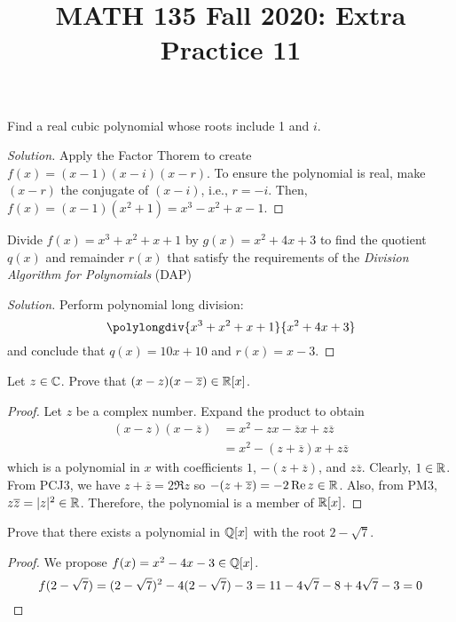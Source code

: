 
\usepackage{polynom}

\title{MATH 135 Fall 2020: Extra Practice 11}


\thispagestyle{firstpage}

\textbf{\@title}


\question Find a real cubic polynomial whose roots include 1 and $i$.
\begin{proof}[Solution]
  Apply the Factor Thorem to create $f(x) = (x-1)(x-i)(x-r)$.
  To ensure the polynomial is real, make $(x-r)$ the conjugate of $(x-i)$, i.e., $r=-i$.
  Then, $f(x) = (x-1)(x^2+1) = x^3 - x^2 + x - 1$.
\end{proof}


\question Divide $f(x)=x^3+x^2+x+1$ by $g(x)=x^2+4x+3$ to find the quotient $q(x)$ and remainder $r(x)$
that satisfy the requirements of the \emph{Division Algorithm for Polynomials} (DAP)
\begin{proof}[Solution]
  Perform polynomial long division:
  \[ \polylongdiv{x^3+x^2+x+1}{x^2+4x+3} \]
  and conclude that $q(x) = 10x + 10$ and $r(x) = x - 3$.
\end{proof}



\question Let $z\in\mathbb{C}$. Prove that $(x-z)(x-\overline{z}) \in \mathbb{R}[x]$.
\begin{proof}
  Let $z$ be a complex number.
  Expand the product to obtain
  \begin{align*}
    (x-z)(x-\overline{z}) & = x^2 - zx - \overline{z}x + z\overline{z}  \\
                          & = x^2 - (z + \overline{z})x + z\overline{z}
  \end{align*}
  which is a polynomial in $x$ with coefficients $1$, $-(z+\overline{z})$, and $z\overline{z}$.
  Clearly, $1 \in \mathbb{R}$.
  From PCJ3, we have $z+\overline{z} = 2\Re z$ so $-(z+\overline{z}) = -2 \Re z \in \mathbb{R}$.
  Also, from PM3, $z\overline{z}=|z|^2 \in \mathbb{R}$.
  Therefore, the polynomial is a member of $\mathbb{R}[x]$.
\end{proof}


\question Prove that there exists a polynomial in $\mathbb{Q}[x]$ with the root $2-\sqrt 7$.
\begin{proof}
  We propose $f(x) = x^2 - 4x - 3 \in \mathbb{Q}[x]$.
  \[ f(2-\sqrt{7}) = (2-\sqrt7)^2 - 4(2-\sqrt7) - 3 = 11 - 4\sqrt7 - 8 + 4\sqrt7 - 3 = 0 \qedhere \]
\end{proof}


